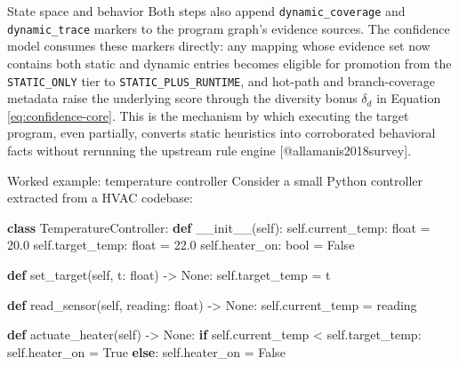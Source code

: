 \documentclass[
  ignorenonframetext,
]{beamer}
\newenvironment{Shaded}{}{}
\newcommand{\BuiltInTok}[1]{\textcolor[rgb]{0.00,0.50,0.00}{#1}}
\newcommand{\ControlFlowTok}[1]{\textcolor[rgb]{0.00,0.44,0.13}{\textbf{#1}}}
\newcommand{\FloatTok}[1]{\textcolor[rgb]{0.25,0.63,0.44}{#1}}
\newcommand{\FunctionTok}[1]{\textcolor[rgb]{0.02,0.16,0.49}{#1}}
\newcommand{\KeywordTok}[1]{\textcolor[rgb]{0.00,0.44,0.13}{\textbf{#1}}}
\newcommand{\NormalTok}[1]{#1}
\newcommand{\OperatorTok}[1]{\textcolor[rgb]{0.40,0.40,0.40}{#1}}
\newcommand{\VariableTok}[1]{\textcolor[rgb]{0.10,0.09,0.49}{#1}}
\begin{document}
\begin{frame}[fragile]{State space and behavior}
Both steps also append \texttt{dynamic\_coverage} and
\texttt{dynamic\_trace} markers to the program graph's evidence sources.
The confidence model consumes these markers directly: any mapping whose
evidence set now contains both static and dynamic entries becomes
eligible for promotion from the \texttt{STATIC\_ONLY} tier to
\texttt{STATIC\_PLUS\_RUNTIME}, and hot-path and branch-coverage
metadata raise the underlying score through the diversity bonus
\(\delta_d\) in Equation \ref{eq:confidence-core}. This is the mechanism
by which executing the target program, even partially, converts static
heuristics into corroborated behavioral facts without rerunning the
upstream rule engine {[}@allamanis2018survey{]}.

\begin{block}{Worked example: temperature controller}
\protect{}\label{worked-example-temperature-controller}
Consider a small Python controller extracted from a HVAC codebase:

\begin{Shaded}
\begin{Highlighting}[]
\KeywordTok{class}\NormalTok{ TemperatureController:}
    \KeywordTok{def} \FunctionTok{\_\_init\_\_}\NormalTok{(}\VariableTok{self}\NormalTok{):}
        \VariableTok{self}\NormalTok{.current\_temp: }\BuiltInTok{float} \OperatorTok{=} \FloatTok{20.0}
        \VariableTok{self}\NormalTok{.target\_temp: }\BuiltInTok{float} \OperatorTok{=} \FloatTok{22.0}
        \VariableTok{self}\NormalTok{.heater\_on: }\BuiltInTok{bool} \OperatorTok{=} \VariableTok{False}

    \KeywordTok{def}\NormalTok{ set\_target(}\VariableTok{self}\NormalTok{, t: }\BuiltInTok{float}\NormalTok{) }\OperatorTok{{-}\textgreater{}} \VariableTok{None}\NormalTok{:}
        \VariableTok{self}\NormalTok{.target\_temp }\OperatorTok{=}\NormalTok{ t}

    \KeywordTok{def}\NormalTok{ read\_sensor(}\VariableTok{self}\NormalTok{, reading: }\BuiltInTok{float}\NormalTok{) }\OperatorTok{{-}\textgreater{}} \VariableTok{None}\NormalTok{:}
        \VariableTok{self}\NormalTok{.current\_temp }\OperatorTok{=}\NormalTok{ reading}

    \KeywordTok{def}\NormalTok{ actuate\_heater(}\VariableTok{self}\NormalTok{) }\OperatorTok{{-}\textgreater{}} \VariableTok{None}\NormalTok{:}
        \ControlFlowTok{if} \VariableTok{self}\NormalTok{.current\_temp }\OperatorTok{\textless{}} \VariableTok{self}\NormalTok{.target\_temp:}
            \VariableTok{self}\NormalTok{.heater\_on }\OperatorTok{=} \VariableTok{True}
        \ControlFlowTok{else}\NormalTok{:}
            \VariableTok{self}\NormalTok{.heater\_on }\OperatorTok{=} \VariableTok{False}
\end{Highlighting}
\end{Shaded}


\end{block}
\end{frame}
\end{document}
